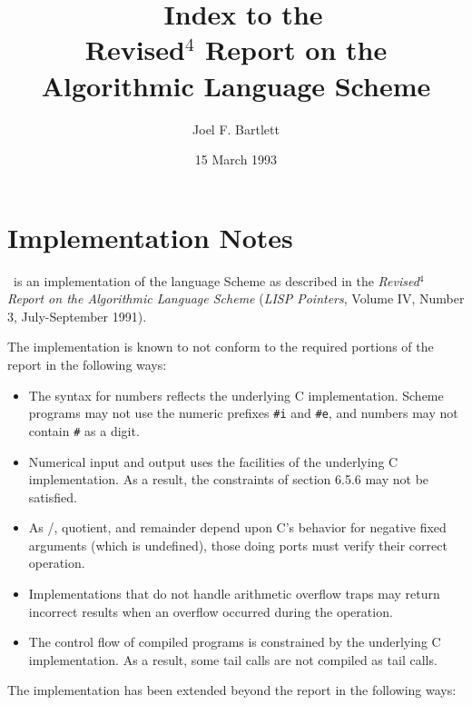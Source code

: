 \documentclass[10pt,twocolumn]{article}
\title{\StoC\ Index to the\\
Revised$^4$ Report on the Algorithmic Language Scheme}
\author{Joel F. Bartlett}
\date{15 March 1993}
\begin{document}
\maketitle

\section*{Implementation Notes}

\StoC\ is an implementation of the language Scheme as
described in the \emph{Revised$^4$ Report on the Algorithmic Language
Scheme} (\emph{LISP Pointers}, Volume IV, Number 3, July-September 1991).

The implementation is known to not conform to the required portions of
the report in the following ways:

\begin{itemize}
\item
The syntax for numbers reflects the underlying C implementation.
Scheme programs may not use the numeric prefixes \texttt{\#i}
and \texttt{\#e}, and numbers may not contain \texttt{\#} as a digit.

\item
Numerical input and output uses the facilities of the
underlying C implementation.  As a result, the constraints of
section 6.5.6 may not be satisfied.

\item
As /, quotient, and remainder depend upon C's behavior for
negative fixed arguments (which is undefined), those doing ports
must verify their correct operation.

\item
Implementations that do not handle arithmetic overflow traps
may return incorrect results when an overflow occurred during
the operation.

\item
The control flow of compiled programs is constrained by the
underlying C implementation.  As a result, some tail calls are not compiled as
tail calls.
\end{itemize}

The implementation has been extended beyond the report in the
following ways:
\end{document}
